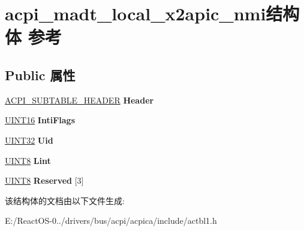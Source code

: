 \hypertarget{structacpi__madt__local__x2apic__nmi}{}\section{acpi\+\_\+madt\+\_\+local\+\_\+x2apic\+\_\+nmi结构体 参考}
\label{structacpi__madt__local__x2apic__nmi}
\subsection*{Public 属性}
\begin{DoxyCompactItemize}
\item 
\mbox{\label{structacpi__madt__local__x2apic__nmi_aea1f4a0f814e549cb260f30140a0b9b4}} 
\hyperlink{structacpi__subtable__header}{A\+C\+P\+I\+\_\+\+S\+U\+B\+T\+A\+B\+L\+E\+\_\+\+H\+E\+A\+D\+ER} {\bfseries Header}
\item 
\mbox{\label{structacpi__madt__local__x2apic__nmi_a690f987636d9a5e52a5832c15d337517}} 
\hyperlink{_processor_bind_8h_a09f1a1fb2293e33483cc8d44aefb1eb1}{U\+I\+N\+T16} {\bfseries Inti\+Flags}
\item 
\mbox{\label{structacpi__madt__local__x2apic__nmi_ab4f3b3471fdb4e9bf0539156912d7ab4}} 
\hyperlink{_processor_bind_8h_ae1e6edbbc26d6fbc71a90190d0266018}{U\+I\+N\+T32} {\bfseries Uid}
\item 
\mbox{\label{structacpi__madt__local__x2apic__nmi_a7aa547bd5382723c064efd7445d62d6c}} 
\hyperlink{_processor_bind_8h_ab27e9918b538ce9d8ca692479b375b6a}{U\+I\+N\+T8} {\bfseries Lint}
\item 
\mbox{\label{structacpi__madt__local__x2apic__nmi_a5d926074bc4acb063997218bdb5e75eb}} 
\hyperlink{_processor_bind_8h_ab27e9918b538ce9d8ca692479b375b6a}{U\+I\+N\+T8} {\bfseries Reserved} \mbox{[}3\mbox{]}
\end{DoxyCompactItemize}


该结构体的文档由以下文件生成\+:\begin{DoxyCompactItemize}
\item 
E\+:/\+React\+O\+S-\/0../drivers/bus/acpi/acpica/include/actbl1.\+h\end{DoxyCompactItemize}

